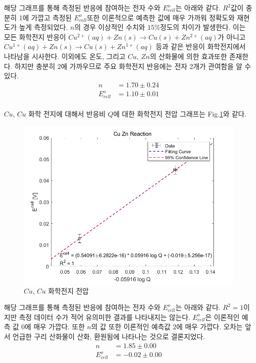 \documentclass[%
 reprint,
 amsmath,amssymb,
 aps,
]{revtex4-2}
\begin{document}
해당 그래프를 통해 측정된 반응에 참여하는 전자 수와 $E^{o}_{cell}$는 아래와 같다. $R^{2}$값이 충분히 1에 가깝고 측정된 $E^{o}_{cell}$또한 이론적으로 예측한 값에 매우 가까워 정확도와 재현도가 높게 측정되었다. $n$의 경우 이상적인 수치와 $15\%$정도의 차이가 발생한다. 이는 모든 화학전지 반응이 $Cu^{2+}(aq) +Zn(s) \rightarrow Cu(s) + Zn^{2+}(aq)$가 아니고 $Cu^{1+}(aq) +Zn(s) \rightarrow Cu(s) + Zn^{1+}(aq)$ 등과 같은 반응이 화학전지에서 나타남을 시사한다. 이외에도 온도, 그리고 $Cu$, $Zn$의 산화물에 의한 효과또한 존재한다. 하지만 충분히 $2$에 가까우므로 주요 화학전지 반응에는 전자 2개가 관여함을 알 수 있다.
\begin{align}
	n &= 1.70 \pm 0.24\\
	E^{o}_{cell} &= 1.10 \pm 0.01
\end{align}
\\

$Cu$, $Cu$ 화학 전지에 대해서 반응비 $Q$에 대한 화학전지 전압 그래프는 Fig.\ref{fig:CuCuReac}와 같다.

\begin{figure}[htbp]
	\includegraphics[width = 0.95\linewidth]{CuCuReac.png}%
	\caption{\label{fig:CuCuReac}$Cu$, $Cu$ 화학전지 전압}
\end{figure}

해당 그래프를 통해 측정된 반응에 참여하는 전자 수와 $E^{o}_{cell}$는 아래와 같다. $R^{2}=1$이지만 측정 데이터 수가 적어 유의미한 결과를 나타내지는 않는다. $E^{o}_{cell}$은 이론적인 예측 값 $0$에 매우 가깝다. 또한 $n$의 값 또한 이론적인 예측값 $2$에 매우 가깝다. 오차는 앞서 언급한 구리 산화물이 산화, 환원됨에 나타나는 것으로 결론지었다.
\begin{align}
	n &= 1.85 \pm 0.00\\
	E^{o}_{cell} &= -0.02 \pm 0.00
\end{align}
\end{document}
